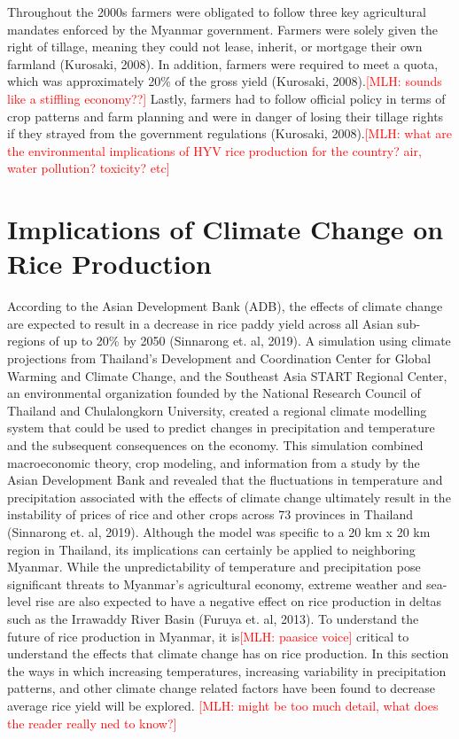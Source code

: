 \documentclass{book}\usepackage{knitr}
\newcommand{\red}[1]{\textcolor{red}{[MLH: #1]}}
\begin{document}
\begin{knitrout}
\begin{kframe}
{	Throughout the 2000s farmers were obligated to follow three key agricultural mandates enforced by the Myanmar government. Farmers were solely given the right of tillage, meaning they could not lease, inherit, or mortgage their own farmland (Kurosaki, 2008). In addition, farmers were required to meet a quota, which was approximately 20\% of the gross yield (Kurosaki, 2008).\red{sounds like a stiffling economy??} Lastly, farmers had to follow official policy in terms of crop patterns and farm planning and were in danger of losing their tillage rights if they strayed from the government regulations (Kurosaki, 2008).\red{what are the environmental implications of HYV rice production for the country? air, water pollution? toxicity? etc}
	
\section{Implications of Climate Change on Rice Production}

According to the Asian Development Bank (ADB), the effects of climate change are expected to result in a decrease in rice paddy yield across all Asian sub-regions of up to 20\% by 2050 (Sinnarong et. al, 2019). A simulation using climate projections from Thailand’s Development and Coordination Center for Global Warming and Climate Change, and the Southeast Asia START Regional Center, an environmental organization founded by the National Research Council of Thailand and Chulalongkorn University, created a regional climate modelling system that could be used to predict changes in precipitation and temperature and the subsequent consequences on the economy. This simulation combined macroeconomic theory, crop modeling, and information from a study by the Asian Development Bank and revealed that the fluctuations in temperature and precipitation associated with the effects of climate change ultimately result in the instability of prices of rice and other crops across 73 provinces in Thailand (Sinnarong et. al, 2019). Although the model was specific to a 20 km x 20 km region in Thailand, its implications can certainly be applied to neighboring Myanmar. While the unpredictability of temperature and precipitation pose significant threats to Myanmar’s agricultural economy, extreme weather and sea-level rise are also expected to have a negative effect on rice production in deltas such as the Irrawaddy River Basin (Furuya et. al, 2013). To understand the future of rice production in Myanmar, it is\red{paasice voice} critical to understand the effects that climate change has on rice production. In this section the ways in which increasing temperatures, increasing variability in precipitation patterns, and other climate change related factors have been found to decrease average rice yield will be explored.
\red{might be too much detail, what does the reader really ned to know?}

}
\end{kframe}
\end{knitrout}
\end{document}
